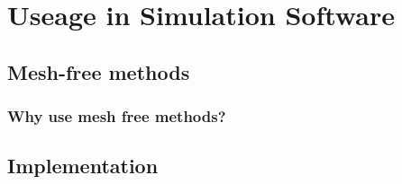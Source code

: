 
\chapter{Useage in Simulation Software} %

\label{Chapter 6} %



\section{Mesh-free methods}


\subsection{Why use mesh free methods?}



\section{Implementation}

